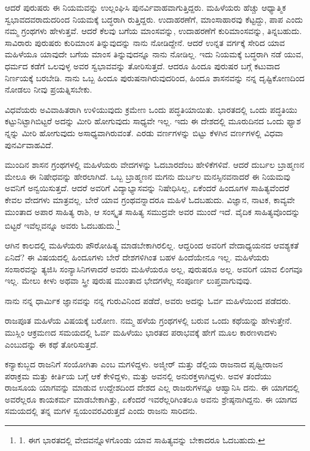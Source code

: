 ಆದರೆ ಪುರುಷರು ಈ ನಿಯಮವನ್ನು ಉಲ್ಲಂಘಿಸಿ ಪುನರ್ವಿವಾಹವಾಗುತ್ತಿದ್ದರು. ಮಹಿಳೆಯರು ಹೆಚ್ಚು ಆಧ್ಯಾತ್ಮಿಕ ಸ್ವಭಾವದವರಾದುದರಿಂದ ನಿಯಮಕ್ಕೆ ಬದ್ಧರಾಗಿ ರುತ್ತಿದ್ದರು. ಉದಾಹರಣೆಗೆ, ಮಾಂಸಾಹಾರವು ಕೆಟ್ಟದ್ದು, ಪಾಪ ಎಂದು ನಮ್ಮ ಗ್ರಂಥಗಳು ಹೇಳುತ್ತವೆ. ಆದರೆ ಕೆಲವು ಬಗೆಯ ಮಾಂಸವನ್ನು, ಉದಾಹರಣೆಗೆ ಕುರಿಮಾಂಸವನ್ನು, ತಿನ್ನಬಹುದು. ಸಾವಿರಾರು ಪುರುಷರು ಕುರಿಮಾಂಸ ತಿನ್ನುವುದನ್ನು ನಾನು ನೋಡಿದ್ದೇನೆ. ಆದರೆ ಉನ್ನತ ವರ್ಗಕ್ಕೆ ಸೇರಿದ ಯಾವ ಮಹಿಳೆಯೂ ಯಾವುದೇ ಬಗೆಯ ಮಾಂಸ ತಿನ್ನುವುದನ್ನೂ ನಾನು ನೋಡಿಲ್ಲ. ಇದು ನಿಯಮಕ್ಕೆ ಬದ್ಧರಾಗಿ ನಡೆ ಯುವ, ಧರ್ಮದ ಕಡೆಗೆ ಒಲವುಳ್ಳ ಅವರ ಸ್ವಭಾವವನ್ನು ತೋರಿಸುತ್ತದೆ. ಆದರೂ ಹಿಂದೂ ಪುರುಷರ ಬಗ್ಗೆ ಕಟುವಾದ ನಿರ್ಣಯಕ್ಕೆ ಬರಬೇಡಿ. ನಾನು ಒಬ್ಬ ಹಿಂದೂ ಪುರುಷನಾಗಿರುವುದರಿಂದ, ಹಿಂದೂ ಶಾಸನವನ್ನು ನನ್ನ ದೃಷ್ಟಿಕೋಣದಿಂದ ನೋಡಲು ನೀವು ಪ್ರಯತ್ನಿಸಬೇಕು.

ವಿಧವೆಯರು ಅವಿವಾಹಿತರಾಗಿ ಉಳಿಯುವುದು ಕ್ರಮೇಣ ಒಂದು ಪದ್ಧತಿಯಾಯಿತು. ಭಾರತದಲ್ಲಿ ಒಂದು ಪದ್ಧತಿಯು ಕಟ್ಟುನಿಟ್ಟಾಗಿಬಿಟ್ಟರೆ ಅದನ್ನು ಮೀರಿ ಹೋಗುವುದು ಸಾಧ್ಯವೇ ಇಲ್ಲ. ಇದು ಈ ದೇಶದಲ್ಲಿ ಮೂರುದಿನದ ಒಂದು ಫ್ಯಾಶ ನ್ನನ್ನು ಮೀರಿ ಹೋಗುವುದು ಅಸಾಧ್ಯವಾಗಿರುವಂತೆ. ಎರಡು ವರ್ಣಗಳನ್ನು ಬಿಟ್ಟು ಕೆಳಗಿನ ವರ್ಣಗಳಲ್ಲಿ ವಿಧವಾ ಪುನರ್ವಿವಾಹವಿದೆ.

ಮುಂದಿನ ಶಾಸನ ಗ್ರಂಥಗಳಲ್ಲಿ ಮಹಿಳೆಯರು ವೇದಗಳನ್ನು ಓದಬಾರದೆಂಬ ಹೇಳಿಕೆಗಳಿವೆ. ಆದರೆ ದುರ್ಬಲ ಬ್ರಾಹ್ಮಣನ ಮೇಲೂ ಈ ನಿಷೇಧವನ್ನು ಹೇರಲಾಗಿದೆ. ಒಬ್ಬ ಬ್ರಾಹ್ಮಣನ ಮಗನು ದುರ್ಬಲ ಮನಸ್ಸಿನವನಾದರೆ ಈ ನಿಯಮವು ಅವನಿಗೆ ಅನ್ವಯಿಸುತ್ತದೆ. ಆದರೆ ಅವರಿಗೆ ವಿದ್ಯಾಭ್ಯಾಸವನ್ನು ನಿಷೇಧಿಸಿಲ್ಲ, ಏಕೆಂದರೆ ಹಿಂದೂಗಳ ಸಾಹಿತ್ಯವೆಂದರೆ ಕೇವಲ ವೇದಗಳು ಮಾತ್ರವಲ್ಲ. ಬೇರೆ ಯಾವ ಗ್ರಂಥವನ್ನಾದರೂ ಮಹಿಳೆ ಓದಬಹುದು. ವಿಜ್ಞಾನ, ನಾಟಕ, ಕಾವ್ಯವೇ ಮುಂತಾದ ಅಪಾರ ಸಾಹಿತ್ಯ ರಾಶಿ, ಆ ಸಂಸ್ಕೃತ ಸಾಹಿತ್ಯ ಸಮುದ್ರವೇ ಅವರ ಮುಂದೆ ಇದೆ. ವೈದಿಕ ಸಾಹಿತ್ಯವೊಂದನ್ನು ಬಿಟ್ಟರೆ ಇವೆಲ್ಲವನ್ನೂ ಅವರು ಓದಬಹುದು.\footnote{1. ಈಗ ಭಾರತದಲ್ಲಿ ವೇದವನ್ನೊಳಗೊಂಡು ಯಾವ ಸಾಹಿತ್ಯವನ್ನು ಬೇಕಾದರೂ ಓದಬಹುದು.}

ಆಗಿನ ಕಾಲದಲ್ಲಿ ಮಹಿಳೆಯರು ಪೌರೋಹಿತ್ಯ ಮಾಡಬೇಕಾಗಿರಲಿಲ್ಲ. ಆದ್ದರಿಂದ ಅವರಿಗೆ ವೇದಾಧ್ಯಯನದ ಆವಶ್ಯಕತೆ ಏನಿದೆ? ಈ ವಿಷಯದಲ್ಲಿ ಹಿಂದೂಗಳು ಬೇರೆ ದೇಶಗಳಿಗಿಂತ ಬಹಳ ಹಿಂದೆಯೇನೂ ಇಲ್ಲ. ಮಹಿಳೆಯರು ಸಂಸಾರವನ್ನು ತ್ಯಜಿಸಿ ಸಂನ್ಯಾಸಿನಿಗಳಾದರೆ ಅವರು ಮಹಿಳೆಯರೂ ಅಲ್ಲ, ಪುರುಷರೂ ಅಲ್ಲ. ಅವರಿಗೆ ಯಾವ ಲಿಂಗವೂ ಇಲ್ಲ. ಮೇಲು ಕೀಳು ಅಥವಾ ಸ್ತ್ರೀ ಪುರುಷ ಮುಂತಾದ ಭೇದಗಳೆಲ್ಲ ಸಂಪೂರ್ಣ ಲುಪ್ತವಾಗುವುವು.

ನಾನು ನನ್ನ ಧಾರ್ಮಿಕ ಜ್ಞಾನವನ್ನು ನನ್ನ ಗುರುವಿನಿಂದ ಪಡೆದೆ, ಅವರು ಅದನ್ನು ಓರ್ವ ಮಹಿಳೆಯಿಂದ ಪಡೆದರು.

ರಾಜಪೂತ ಮಹಿಳೆಯ ವಿಷಯಕ್ಕೆ ಬರೋಣ. ನಮ್ಮ ಹಳೆಯ ಗ್ರಂಥಗಳಲ್ಲಿ ಬರುವ ಒಂದು ಕಥೆಯನ್ನು ಹೇಳುತ್ತೇನೆ. ಮುಸ್ಲಿಂ ಆಕ್ರಮಣದ ಸಮಯದಲ್ಲಿ ಓರ್ವ ಮಹಿಳೆಯು ಭಾರತದ ಪರಾಭವಕ್ಕೆ ಹೇಗೆ ಮೂಲ ಕಾರಣಳಾದಳು ಎಂಬುದನ್ನು ಈ ಕಥೆ ತೋರಿಸುತ್ತದೆ.

ಕನ್ಯಾಕುಬ್ಜದ ರಾಜನಿಗೆ ಸಂಯೋಗಿತಾ ಎಂಬ ಮಗಳಿದ್ದಳು. ಅಜ್ಮೀರ್ ಮತ್ತು ಡೆಲ್ಲಿಯ ರಾಜನಾದ ಪೃಥ್ವೀರಾಜನ ಪರಾಕ್ರಮ ಮತ್ತು ಕೀರ್ತಿಯ ಬಗ್ಗೆ ಆಕೆ ಕೇಳಿದ್ದಳು, ಮತ್ತು ಅವನಲ್ಲಿ ಅನುರಕ್ತಳಾಗಿದ್ದಳು. ಅವಳ ತಂದೆಯು ರಾಜಸೂಯ ಯಾಗವನ್ನು ಮಾಡುವ ಉದ್ದೇಶದಿಂದ ದೇಶದ ಎಲ್ಲ ರಾಜರುಗಳನ್ನೂ ಆಹ್ವಾನಿಸಿ ದನು. ಈ ಯಾಗದಲ್ಲಿ ಅವರೆಲ್ಲರೂ ಕಾಯಕರ್ಮ ಮಾಡಬೇಕಾಗಿತ್ತು, ಏಕೆಂದರೆ ಇವರೆಲ್ಲರಿಗಿಂತಲೂ ಅವನು ಶ್ರೇಷ್ಠನಾಗಿದ್ದನು. ಈ ಯಾಗದ ಸಮಯದಲ್ಲಿ ತನ್ನ ಮಗಳ ಸ್ವಯಂವರವಿರುತ್ತದೆ ಎಂದು ರಾಜನು ಸಾರಿದನು.

